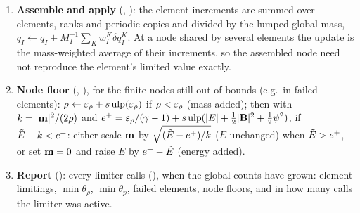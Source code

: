 \begin{enumerate}[leftmargin=*]
\begin{itemize}
\[\delta E_I=(\theta_p-1)(\Et_I-\bar E),\quad
\delta\bB_I=\delta\psi_I=0 .
\]
\end{itemize}
\item \textbf{Assemble and apply} (, ): the element increments are summed
over elements, ranks and periodic copies and divided by the lumped global mass, $q_I\leftarrow q_I+M_I^{-1}\sum_K w^K_I\delta q^K_I$.
At a node shared by several elements the update is the mass-weighted average of their increments, so the
assembled node need not reproduce the element's limited value exactly.
\item \textbf{Node floor} (, ), for the finite nodes still out of bounds
(e.g.\ in failed elements): $\rho\leftarrow\varepsilon_\rho+s\,\mathrm{ulp}(\varepsilon_\rho)$ if $\rho<\varepsilon_\rho$ (mass added);
then with $k=|\mathbf{m}|^2/(2\rho)$ and $e^+=\varepsilon_p/(\gamma-1)+s\,\mathrm{ulp}(|E|+\tfrac12|\mathbf{B}|^2+\tfrac12\psi^2)$, if
$\tilde E-k<e^+$: either scale $\mathbf{m}$ by $\sqrt{(\tilde E-e^+)/k}$ ($E$ unchanged) when $\tilde E>e^+$, or set $\mathbf{m}=0$ and
raise $E$ by $e^+-\tilde E$ (energy added).
\item \textbf{Report} (): every \repevery{} limiter calls (),
when the global counts have grown: element limitings, $\min\theta_\rho$, $\min\theta_p$, failed elements, node
floors, and in how many calls the limiter was active.
\end{enumerate}
